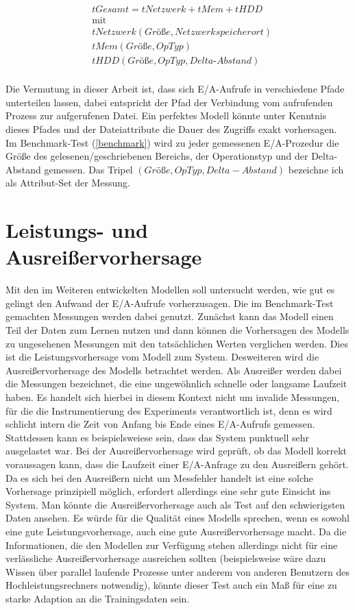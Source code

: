 \documentclass[
	12pt,
	a4paper,
	BCOR10mm,
	DIV14,
	listof=totoc,
	bibliography=totoc,
	headsepline
]{scrreprt}
\begin{document}
\begin{align*}
&tGesamt = tNetzwerk + tMem + tHDD\\
&\text{mit}\\
&tNetzwerk(Grö\text{ß}e, Netzwerkspeicherort)\\
&tMem(Grö\text{ß}e,OpTyp)\\
&tHDD(Grö\text{ß}e,OpTyp,Delta\text{-}Abstand)\\
\end{align*}

Die Vermutung in dieser Arbeit ist, dass sich E/A-Aufrufe in verschiedene Pfade unterteilen lassen, dabei entspricht der Pfad der Verbindung vom aufrufenden Prozess zur aufgerufenen Datei. Ein perfektes Modell könnte unter Kenntnis dieses Pfades und der Dateiattribute die Dauer des Zugriffs exakt vorhersagen.\\
Im Benchmark-Test (\ref{benchmark}) wird zu jeder gemessenen E/A-Prozedur die Größe des gelesenen/geschriebenen Bereichs, der Operationstyp und der Delta-Abstand gemessen.
Das Tripel $(Größe,OpTyp,Delta-Abstand)$ bezeichne ich als Attribut-Set der Messung.

\section{Leistungs- und Ausreißervorhersage}
Mit den im Weiteren entwickelten Modellen soll untersucht werden, wie gut es gelingt den Aufwand der E/A-Aufrufe vorherzusagen. 
Die im Benchmark-Test gemachten Messungen werden dabei genutzt. Zunächst kann das Modell einen Teil der Daten zum Lernen nutzen und dann können die Vorhersagen des Modells zu ungesehenen Messungen mit den tatsächlichen Werten verglichen werden. Dies ist die Leistungsvorhersage vom Modell zum System. 
Desweiteren wird die Ausreißervorhersage des Modells betrachtet werden. Als Ausreißer werden dabei die Messungen bezeichnet, die eine ungewöhnlich schnelle oder langsame Laufzeit haben. Es handelt sich hierbei in diesem Kontext nicht um invalide Messungen, für die die Instrumentierung des Experiments verantwortlich ist, denn es wird schlicht intern die Zeit von Anfang bis Ende eines E/A-Aufrufs gemessen. Stattdessen kann es beispielsweiese sein, dass das System punktuell sehr ausgelastet war. 
Bei der Ausreißervorhersage wird geprüft, ob das Modell korrekt voraussagen kann, dass die Laufzeit einer E/A-Anfrage zu den Ausreißern gehört. Da es sich bei den Ausreißern nicht um Messfehler handelt ist eine solche Vorhersage prinzipiell möglich, erfordert allerdings eine sehr gute Einsicht ins System.
Man könnte die Ausreißervorhersage auch als Test auf den schwierigsten Daten ansehen. Es würde für die Qualität eines Modells sprechen, wenn es sowohl eine gute Leistungsvorhersage, auch eine gute Ausreißervorhersage macht. Da die Informationen, die den Modellen zur Verfügung stehen allerdings nicht für eine verlässliche Ausreißervorhersage ausreichen sollten (beispielsweise wäre dazu Wissen über parallel laufende Prozesse unter anderem von anderen Benutzern des Hochleistungsrechners notwendig), könnte dieser Test auch ein Maß für eine zu starke Adaption an die Trainingsdaten sein.
\end{document}

